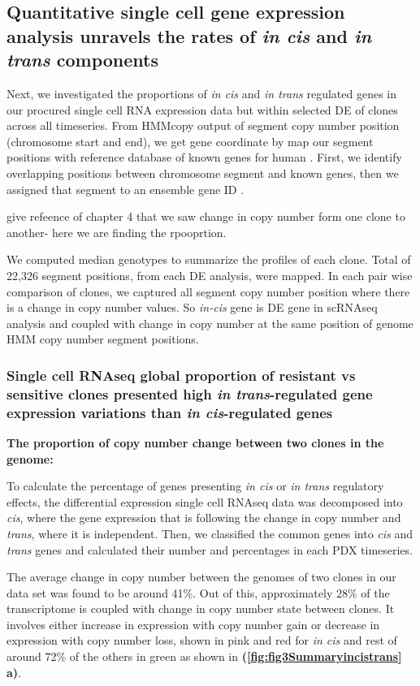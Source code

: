 \subsection{Quantitative single cell gene expression analysis unravels the rates of \textit{ in cis} and \textit{in trans} components}
Next, we investigated the proportions of \textit{in cis} and \textit{in trans} regulated genes in our procured single cell RNA expression data but within selected \ac{DE} of clones across all timeseries. From HMMcopy output of segment copy number position (chromosome start and end), we get gene coordinate by map our segment positions with reference database of known genes for human  \cite{carlson2015txdb}. First, we identify overlapping positions between chromosome segment and known genes, then we assigned that segment to an ensemble gene ID \cite{rainer2019ensembldb}.

give refeence of chapter 4 that we saw change in copy number form one clone to another- here we are finding the rpooprtion.

We computed median genotypes to summarize the profiles of each clone.
Total of 22,326 segment positions, from each DE analysis, were mapped. In each pair wise comparison of clones, we captured all segment copy number position where there is a change in copy number values. So \textit{in-cis} gene is DE gene in scRNAseq analysis and coupled with change in copy number at the same position of genome HMM copy number segment positions.

\subsubsection{Single cell RNAseq global proportion of resistant vs sensitive clones presented high \textit{in trans}-regulated gene expression variations than \textit{in cis}-regulated genes} 

\textbf{The proportion of copy number change between two clones in the genome:}

To calculate the percentage of genes presenting \textit{in cis} or \textit{in trans} regulatory effects, the differential expression single cell RNAseq data was decomposed into \textit{cis}, where the gene expression that is following the change in copy number and \textit{trans}, where it is independent. Then, we classified the common genes into  \textit{cis}  and \textit{trans} genes and calculated their number and percentages in each PDX timeseries. 

The average change in copy number between the genomes of two clones in our data set was found to be around 41\%. Out of this, approximately 28\% of the transcriptome is coupled with change in copy number state between clones. It involves either increase in expression with copy number gain or decrease in expression with copy number loss, shown in pink and red for \textit{in cis} and rest of  around 72\% of the others in green as shown in  \textbf{(\autoref{fig:fig3Summaryincistrans} a)}.

